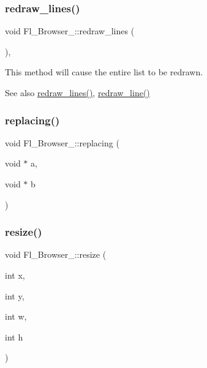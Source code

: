 \subsubsection{\texorpdfstring{redraw\+\_\+lines()}{redraw\_lines()}}
{\footnotesize\ttfamily void Fl\+\_\+\+Browser\+\_\+\+::redraw\+\_\+lines (\begin{DoxyParamCaption}{ }\end{DoxyParamCaption})\hspace{0.3cm}{\ttfamily [inline]}, {\ttfamily [protected]}}

This method will cause the entire list to be redrawn. \begin{DoxySeeAlso}{See also}
\hyperlink{class_fl___browser___a78e2b46f393546abbe22ec28e048f8de}{redraw\+\_\+lines()}, \hyperlink{class_fl___browser___ac06f58d6aa13a432825231c19aba6544}{redraw\+\_\+line()} 
\end{DoxySeeAlso}
\mbox{\label{class_fl___browser___ac741e98e5af5630f9c693066ef2cc578}} 
\subsubsection{\texorpdfstring{replacing()}{replacing()}}
{\footnotesize\ttfamily void Fl\+\_\+\+Browser\+\_\+\+::replacing (\begin{DoxyParamCaption}\item[{void $\ast$}]{a,  }\item[{void $\ast$}]{b }\end{DoxyParamCaption})\hspace{0.3cm}{\ttfamily [protected]}}

\mbox{\label{class_fl___browser___a3e9c0647239e6952aa0636ad7db72ada}} 
\subsubsection{\texorpdfstring{resize()}{resize()}}
{\footnotesize\ttfamily void Fl\+\_\+\+Browser\+\_\+\+::resize (\begin{DoxyParamCaption}\item[{int}]{x,  }\item[{int}]{y,  }\item[{int}]{w,  }\item[{int}]{h }\end{DoxyParamCaption})\hspace{0.3cm}{\ttfamily [virtual]}}

